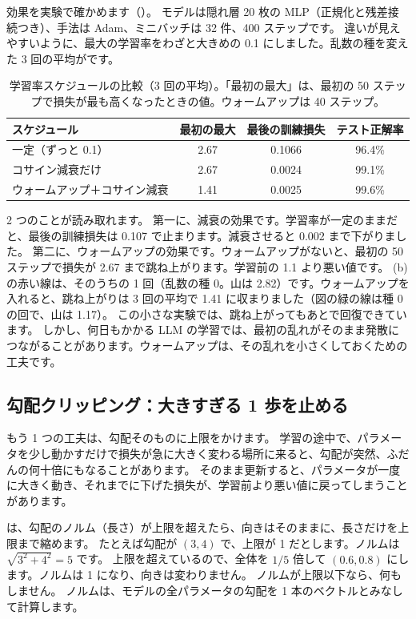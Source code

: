 効果を実験で確かめます（）。
モデルは隠れ層 20 枚の MLP（正規化と残差接続つき）、手法は Adam、ミニバッチは 32 件、400 ステップです。
違いが見えやすいように、最大の学習率をわざと大きめの 0.1 にしました。乱数の種を変えた 3 回の平均がです。

\begin{table}[tbp]
\centering
\caption{学習率スケジュールの比較（3 回の平均）。「最初の最大」は、最初の 50 ステップで損失が最も高くなったときの値。ウォームアップは 40 ステップ。}
\label{tab:training-schedule}
\small
\begin{tabular}{lccc}
\toprule
スケジュール & 最初の最大 & 最後の訓練損失 & テスト正解率 \\
\midrule
一定（ずっと 0.1） & 2.67 & 0.1066 & 96.4\% \\
コサイン減衰だけ & 2.67 & 0.0024 & 99.1\% \\
ウォームアップ＋コサイン減衰 & 1.41 & 0.0025 & 99.6\% \\
\bottomrule
\end{tabular}
\end{table}

2 つのことが読み取れます。
第一に、減衰の効果です。学習率が一定のままだと、最後の訓練損失は 0.107 で止まります。減衰させると 0.002 まで下がりました。
第二に、ウォームアップの効果です。ウォームアップがないと、最初の 50 ステップで損失が 2.67 まで跳ね上がります。学習前の 1.1 より悪い値です。
(b) の赤い線は、そのうちの 1 回（乱数の種 0。山は 2.82）です。ウォームアップを入れると、跳ね上がりは 3 回の平均で 1.41 に収まりました（図の緑の線は種 0 の回で、山は 1.17）。
この小さな実験では、跳ね上がってもあとで回復できています。
しかし、何日もかかる LLM の学習では、最初の乱れがそのまま発散につながることがあります。ウォームアップは、その乱れを小さくしておくための工夫です。

\subsection*{勾配クリッピング：大きすぎる 1 歩を止める}

もう 1 つの工夫は、勾配そのものに上限をかけます。
学習の途中で、パラメータを少し動かすだけで損失が急に大きく変わる場所に来ると、勾配が突然、ふだんの何十倍にもなることがあります。
そのまま更新すると、パラメータが一度に大きく動き、それまでに下げた損失が、学習前より悪い値に戻ってしまうことがあります。

は、勾配のノルム（長さ）が上限を超えたら、向きはそのままに、長さだけを上限まで縮めます\cite{pascanu2013difficulty}。
たとえば勾配が $(3, 4)$ で、上限が 1 だとします。ノルムは $\sqrt{3^2+4^2}=5$ です。
上限を超えているので、全体を $1/5$ 倍して $(0.6, 0.8)$ にします。ノルムは 1 になり、向きは変わりません。
ノルムが上限以下なら、何もしません。
ノルムは、モデルの全パラメータの勾配を 1 本のベクトルとみなして計算します。

